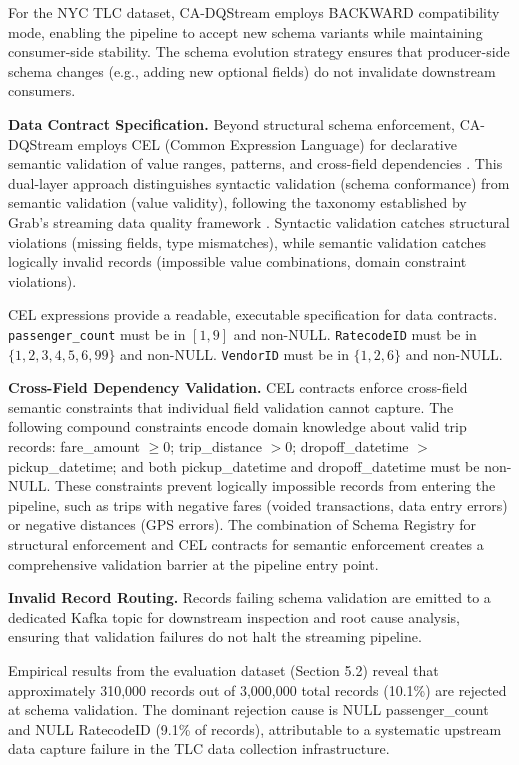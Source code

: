 For the NYC TLC dataset, CA-DQStream employs BACKWARD compatibility mode, enabling the pipeline to accept new schema variants while maintaining consumer-side stability. The schema evolution strategy ensures that producer-side schema changes (e.g., adding new optional fields) do not invalidate downstream consumers.

\textbf{Data Contract Specification.} Beyond structural schema enforcement, CA-DQStream employs CEL (Common Expression Language) for declarative semantic validation of value ranges, patterns, and cross-field dependencies \citep{confluent_dq_patterns}. This dual-layer approach distinguishes syntactic validation (schema conformance) from semantic validation (value validity), following the taxonomy established by Grab's streaming data quality framework \citep{grab_streaming_dq}. Syntactic validation catches structural violations (missing fields, type mismatches), while semantic validation catches logically invalid records (impossible value combinations, domain constraint violations).

CEL expressions provide a readable, executable specification for data contracts. \texttt{passenger\_count} must be in $[1, 9]$ and non-NULL. \texttt{RatecodeID} must be in $\{1, 2, 3, 4, 5, 6, 99\}$ and non-NULL. \texttt{VendorID} must be in $\{1, 2, 6\}$ and non-NULL.

\textbf{Cross-Field Dependency Validation.} CEL contracts enforce cross-field semantic constraints that individual field validation cannot capture. The following compound constraints encode domain knowledge about valid trip records: fare\_amount $\geq 0$; trip\_distance $> 0$; dropoff\_datetime $>$ pickup\_datetime; and both pickup\_datetime and dropoff\_datetime must be non-NULL. These constraints prevent logically impossible records from entering the pipeline, such as trips with negative fares (voided transactions, data entry errors) or negative distances (GPS errors). The combination of Schema Registry for structural enforcement and CEL contracts for semantic enforcement creates a comprehensive validation barrier at the pipeline entry point.

\textbf{Invalid Record Routing.} Records failing schema validation are emitted to a dedicated Kafka topic for downstream inspection and root cause analysis, ensuring that validation failures do not halt the streaming pipeline.

Empirical results from the evaluation dataset (Section 5.2) reveal that approximately 310,000 records out of 3,000,000 total records (10.1\%) are rejected at schema validation. The dominant rejection cause is NULL passenger\_count and NULL RatecodeID (9.1\% of records), attributable to a systematic upstream data capture failure in the TLC data collection infrastructure.

